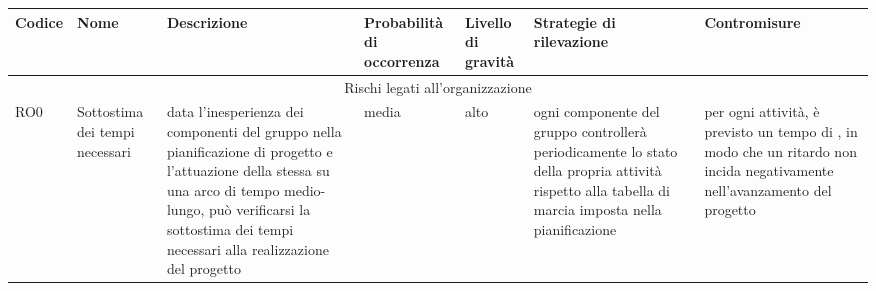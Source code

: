 \documentclass[../PianodiProgetto.tex]{subfiles}
\begin{document}
\begin{longtable}{|p{15mm}|p{23.5mm}|p{38mm}|p{22mm}|p{19mm}|p{30mm}|p{30mm}|}
		\newpage
	
		\hline \textbf{Codice} & \textbf{Nome} & \textbf{Descrizione} & \textbf{Probabilità di occorrenza} & \textbf{Livello di gravità} & \textbf{Strategie di rilevazione} & \textbf{Contromisure} \\

		\hline \multicolumn{7}{|c|}{Rischi legati all'organizzazione} \\
		
		\hline RO0 & Sottostima dei tempi necessari & data l'inesperienza dei componenti del gruppo nella pianificazione di progetto e l'attuazione della stessa su una arco di tempo medio-lungo, può verificarsi la sottostima dei tempi necessari alla realizzazione del progetto & media & alto & ogni componente del gruppo controllerà periodicamente lo stato della propria attività rispetto alla tabella di marcia imposta nella pianificazione & per ogni attività, è previsto un tempo di \glossario{slack}{Slack}, in modo che un ritardo non incida negativamente nell'avanzamento del progetto \\

		\hline

	\end{longtable}
\end{document}
